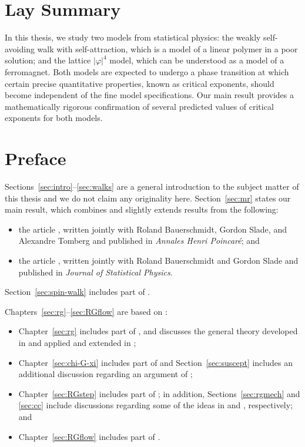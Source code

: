 \cleardoublepage

\chapter{Lay Summary}

In this thesis, we study two models from statistical physics: the weakly self-avoiding
walk with self-attraction, which is a model of a linear polymer in a poor solution; and
the lattice $|\varphi|^4$ model, which can be understood as a model of a ferromagnet.
Both models are expected to undergo a phase transition at which certain precise
quantitative properties, known as critical exponents, should become independent of the
fine model specifications. Our main result provides a mathematically rigorous confirmation
of several predicted values of critical exponents for both models.

\chapter{Preface}

Sections~\ref{sec:intro}--\ref{sec:walks} are a general introduction to the
subject matter of this thesis and we do not claim any originality here. Section~\ref{sec:mr}
states our main result, which combines and slightly extends results from the following:
\begin{itemize}
\item
the article \cite{BSTW-clp}, written jointly with
Roland Bauerschmidt, Gordon Slade, and Alexandre Tomberg and
published in \textit{Annales Henri Poincar\'{e}};
and

\item
the article \cite{BSW-saw-sa}, written jointly with
Roland Bauerschmidt and Gordon Slade and published
in \textit{Journal of Statistical Physics}.
\end{itemize}
Section~\ref{sec:spin-walk} includes part of \cite{BSW-saw-sa}.

Chapters~\ref{sec:rg}--\ref{sec:RGflow} are based on \cite{BSTW-clp,BSW-saw-sa}:
\begin{itemize}
\item
Chapter~\ref{sec:rg} includes part of \cite{BSTW-clp,BSW-saw-sa},
and discusses the general theory developed in
\cite{BS-rg-norm,BS-rg-loc,BBS-rg-pt,BS-rg-IE,BS-rg-step}
and applied and extended in
\cite{BBS-saw4-log,BBS-saw4,ST-phi4};

\item
Chapter~\ref{sec:chi-G-xi} includes part of \cite{BSTW-clp,BSW-saw-sa}
and Section~\ref{sec:suscept} includes an additional discussion regarding an argument
of \cite{BBS-saw4-log};

\item
Chapter~\ref{sec:RGstep} includes part of \cite{BSTW-clp}; in addition,
Sections~\ref{sec:rgmech} and \ref{sec:cc} include discussions regarding some of the ideas in
\cite{BS-rg-step} and \cite{BS-rg-loc}, respectively; and

\item
Chapter~\ref{sec:RGflow} includes part of \cite{BSW-saw-sa}.
\end{itemize}

